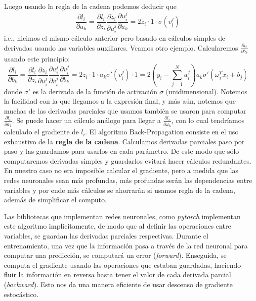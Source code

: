 Luego usando la regla de la cadena podemos deducir que
$$ \frac{\partial l_i}{\partial a_k} = \frac{\partial l_i}{\partial z_i}\frac{\partial z_i}{\partial u_i^j}\frac{\partial u_i^j}{\partial a_k} = 2z_i \cdot 1 \cdot \sigma(v_i^j) \,$$
i.e., hicimos el mismo cálculo anterior pero basado en cálculos simples de derivadas usando las variables auxiliares. Veamos otro ejemplo. Calcularemos $\frac{\partial l_i}{\partial b_k}$ usando este principio:
$$ \frac{\partial l_i}{\partial b_k} = \frac{\partial l_i}{\partial z_i}\frac{\partial z_i}{\partial u_i^j}\frac{\partial u_i^j}{\partial v_i^j}\frac{\partial v_i^j}{\partial b_k} = 2z_i \cdot 1 \cdot a_k\sigma'(v_i^j)\cdot 1 = 2 (y_i-\sum^N_{j=1}u_i^j)a_k\sigma'(\omega^T_j x_i+b_j) \,$$
donde $\sigma'$ es la derivada de la función de activación $\sigma$ (unidimensional). \newp Notemos la facilidad con la que llegamos a la expresión final, y más aún, notemos que muchas de las derivadas parciales que usamos también se usaron para computar $\frac{\partial l_i}{\partial a_k}$. Se puede hacer un cálculo análogo para llegar a $\frac{\partial l_i}{\partial \omega_k}$, con lo cual tendríamos calculado el gradiente de $l_i$. 
\newp El algoritmo Back-Propagation consiste en el uso exhaustivo de la \textbf{regla de la cadena}. Calculamos derivadas parciales paso por paso y las guardamos para usarlos en cada parámetro. De este modo que sólo computaremos derivadas simples y guardarlos evitará hacer cálculos redundantes. %
En nuestro caso no era imposible calcular el gradiente, pero a medida que las redes neuronales sean más profundas, más profundas serán las dependencias entre variables y por ende más cálculos se ahorrarán si usamos regla de la cadena, además de simplificar el computo.

\newp Las bibliotecas que implementan redes neuronales, como \textit{pytorch} implementan este algoritmo implícitamente, de modo que al definir las operaciones entre variables, se guardan las derivadas parciales respectivas. Durante el entrenamiento, una vez que la información pasa a través de la red neuronal para computar una predicción, se computará un error (\textit{forward}). Enseguida, se computa el gradiente usando las operaciones que estaban guardadas, haciendo fluir la información en reversa hasta tener el valor de cada derivada parcial (\textit{backward}). Esto nos da una manera eficiente de usar descenso de gradiente estocástico.

